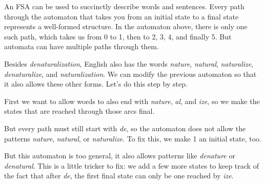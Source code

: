 An FSA can be used to succinctly describe words and sentences.
Every path through the automaton that takes you from an initial state to a final state represents a well-formed structure.
In the automaton above, there is only one such path, which takes us from 0 to 1, then to 2, 3, 4, and finally 5.
But automata can have multiple paths through them.
%
\begin{examplebox}
    Besides \emph{denaturalization}, English also has the words \emph{nature}, \emph{natural}, \emph{naturalize}, \emph{denaturalize}, and \emph{naturalization}.
    We can modify the previous automaton so that it also allows these other forms. 
    Let's do this step by step.

    First we want to allow words to also end with \emph{nature}, \emph{al}, and \emph{ize}, so we make the states that are reached through those arcs final.
    \begin{center}
    \end{center}
    But every path must still start with \emph{de}, so the automaton does not allow the patterns \emph{nature}, \emph{natural}, or \emph{naturalize}.
    To fix this, we make 1 an initial state, too.
    \begin{center}
    \end{center}
    But this automaton is too general, it also allows patterns like \emph{denature} or \emph{denatural}.
    This is a little tricker to fix: we add a few more states to keep track of the fact that after \emph{de}, the first final state can only be one reached by \emph{ize}.
    \begin{center}
\end{center}
\end{examplebox}
